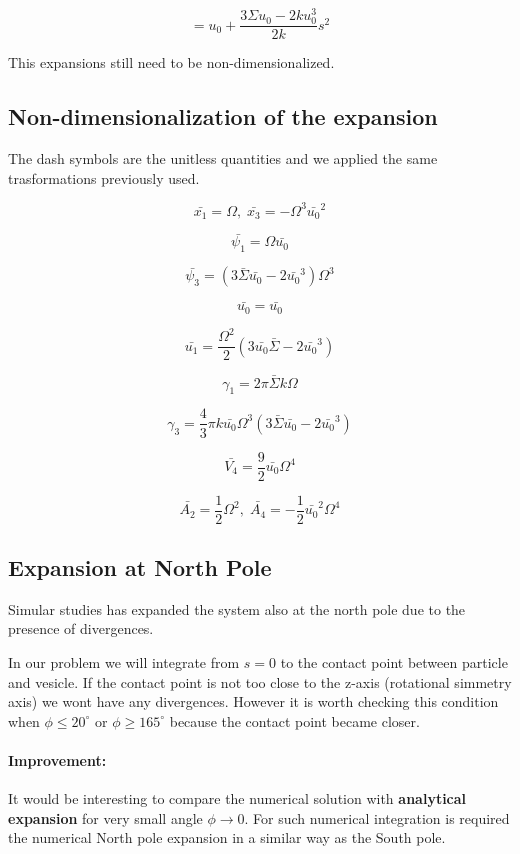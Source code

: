 \documentclass[12pt]{article}
\begin{document}
$$
= u_0  + \frac{3  \Sigma u_0 - 2  k u_0^3}{2 k }s^2
$$

This expansions still need to be non-dimensionalized.

\subsection{Non-dimensionalization of the expansion}
The dash symbols are the unitless quantities and we applied the same trasformations previously used.


$$
\bar{x_1} = \Omega ,\;  \bar{x_3} = - \Omega^3 \bar{u_0}^2 
$$

$$
\bar{\psi_1}  = \Omega \bar{u_0}
$$

$$
\bar{\psi_3} = (3\bar{\Sigma} \bar{u_0} - 2 \bar{u_0}^3)\Omega^3
$$

$$
\bar{u_0} = \bar{u_0} 
$$

$$
\bar{u_1} = \frac{\Omega^2}{2} (3\bar{u_0} \bar{\Sigma} - 2 \bar{u_0}^3) 
$$

$$
\gamma_1 = 2 \pi \bar{\Sigma} k \Omega 
$$

$$
\gamma_3 = \frac{4}{3} \pi k \bar{u_0} \Omega^3 (3 \bar{\Sigma} \bar{u_0} - 2 \bar{u_0}^3)
$$


$$
\bar{V_4} = \frac{9}{2}\bar{u_0} \Omega^4
$$

$$
\bar{A_2} = \frac{1}{2} \Omega^2 ,\; \bar{A_4} = -\frac{1}{2} \bar{u_0}^2 \Omega^4
$$

\subsection{Expansion at North Pole}
Simular studies \cite{freyMembraneAreaGain2022} \cite{christActiveShapeOscillations2021} has expanded the system also at the north pole due to the presence of divergences.

In our problem we will integrate from $s=0$ to the contact point between particle and vesicle. If the contact point is not too close to the z-axis (rotational simmetry axis) we wont have any divergences. However it is worth checking this condition when $\phi \leq 20^{\circ}$ or $\phi \geq 165^{\circ}$ because the contact point became closer.

\paragraph{Improvement:} It would be interesting to compare the numerical solution with \textbf{analytical expansion} for very small angle $\phi \to 0$. For such numerical integration is required the numerical North pole expansion in a similar way as the South pole.
\end{document}
